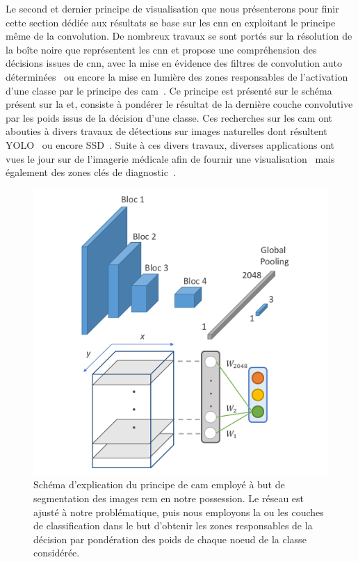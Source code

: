 Le second et dernier principe de visualisation que nous présenterons pour finir cette section dédiée aux résultats se base sur les \gls{cnn} en exploitant le principe même de la convolution. De nombreux travaux se sont portés sur la résolution de la boîte noire que représentent les \gls{cnn} et propose une compréhension des décisions issues de \gls{cnn}, avec la mise en évidence des filtres de convolution auto déterminées~\cite{Zeiler2014} ou encore la mise en lumière des zones responsables de l'activation d'une classe par le principe des \gls{cam}~\cite{Zhou2015}. Ce principe est présenté sur le schéma présent sur la  et, consiste à pondérer le résultat de la dernière couche convolutive par les poids issus de la décision d'une classe. Ces recherches sur les \gls{cam} ont abouties à divers travaux de détections sur images naturelles dont résultent YOLO~\cite{Redmon2016} ou encore SSD~\cite{Liu2016}. Suite à ces divers travaux, diverses applications ont vues le jour sur de l'imagerie médicale afin de fournir une visualisation~\cite{jia2017} mais également des zones clés de diagnostic~\cite{Park2019}.\par 

\begin{figure}[H]
    \centering
    \includegraphics[width=\linewidth]{contents/chapter_6/resources/scheme_image_improvement_cam.pdf}
    \caption{Schéma d'explication du principe de \gls{cam} employé à but de segmentation des images \gls{rcm} en notre possession. Le réseau est ajusté à notre problématique, puis nous employons la ou les couches de classification dans le but d'obtenir les zones responsables de la décision par pondération des poids de chaque noeud de la classe considérée.}
    \label{fig:scheme_image_improvement_cam}
\end{figure}\par


